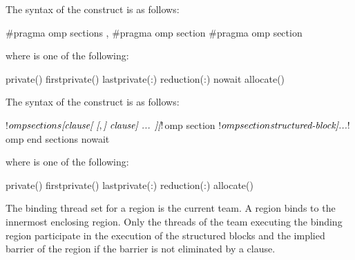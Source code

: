 \syntax
\begin{ccppspecific}
The syntax of the  construct is as follows:

\begin{ompcPragma}
#pragma omp sections \plc{[clause[ [},\plc{] clause] ... ] new-line}
   {
   \plc{[}#pragma omp section \plc{]}
   \plc{[}#pragma omp section 
      \plc{structured-block]}
   }
\end{ompcPragma}

where  is one of the following:

{}
\begin{indentedcodelist}
private()
firstprivate()
lastprivate(\plc{[ lastprivate-modifier}:\plc{] list})
reduction(\plc{[reduction-modifier}\plc{,]reduction-identifier }:)
nowait
allocate(\plc{[allocator: ]})
\end{indentedcodelist}
\end{ccppspecific}

\begin{fortranspecific}
The syntax of the  construct is as follows:

\begin{ompfPragma}
!$omp sections \plc{[clause[ [},\plc{] clause] ... ]}
   \plc{[}!$omp section\plc{]}
   \plc{[}!$omp section
      \plc{structured-block]}
   \plc{...}
!$omp end sections \plc{[}nowait\plc{]}
\end{ompfPragma}

\begin{samepage}
where  is one of the following:

{}
\begin{indentedcodelist}
private()
firstprivate()
lastprivate(\plc{[ lastprivate-modifier}:\plc{] list})
reduction(\plc{[reduction-modifier}\plc{,]reduction-identifier }:)
allocate(\plc{[allocator: ]})
\end{indentedcodelist}
\end{samepage}
\end{fortranspecific}

\binding
The binding thread set for a  region is the current team. A 
region binds to the innermost enclosing  region. Only the threads of the team
executing the binding  region participate in the execution of the structured
blocks and the implied barrier of the  region if the barrier is not eliminated
by a  clause.


